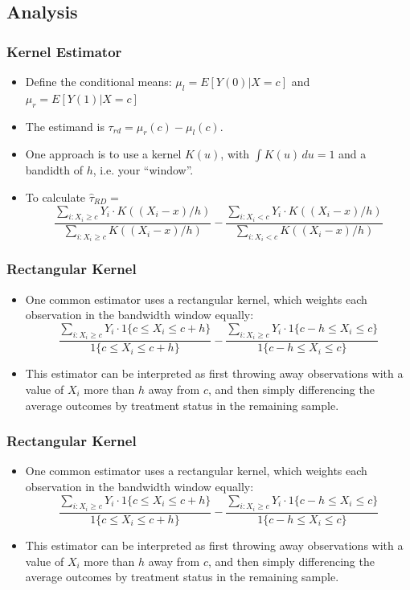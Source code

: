 \documentclass{beamer}
\begin{document}
\subsection{Analysis}
\begin{frame}
  \frametitle{Kernel Estimator}
  \begin{itemize}
  \item Define the conditional means: $\mu_l=E[Y(0)|X=c]$ and $\mu_r=E[Y(1)|X=c]$
  \item The estimand is $\tau_{rd}=\mu_r(c) - \mu_l(c)$.
  \item One approach is to use a kernel $K(u)$, with $\int \! K(u) \,
    du = 1$ and a bandidth of $h$, i.e. your ``window''. 
    \item To calculate $\hat \tau_{RD} = $
$$
\frac{\sum_{i:X_i \geq c} Y_i \cdot K((X_i
  -x)/h)}{\sum_{i:X_i\geq c} K((X_i - x)/h)} - \frac{\sum_{i:X_i < c} Y_i \cdot K((X_i
   -x)/h)}{\sum_{i:X_i< c} K((X_i - x)/h)}
$$
 \end{itemize}
\end{frame}

\begin{frame}
  \frametitle{Rectangular Kernel}
  \begin{itemize}
  \item One common estimator uses a rectangular kernel, which weights each observation in the bandwidth window  equally:
\small
$$
\frac{\sum_{i:X_i \geq c} Y_i \cdot 1\{c\leq X_i \leq c + h\}}{1\{c\leq X_i \leq c + h\}} - \frac{\sum_{i:X_i \geq c} Y_i \cdot 1\{c-h\leq X_i \leq c \}}{1\{c-h\leq X_i \leq c\}}
$$
\normalsize
\item  This estimator can be interpreted as first throwing away observations with a value of $X_i$ more than $h$ away from $c$, and then simply differencing the average outcomes by treatment status in the remaining sample. 
\end{itemize}
\end{frame}

\begin{frame}
  \frametitle{Rectangular Kernel}
  \begin{itemize}
  \item One common estimator uses a rectangular kernel, which weights each observation in the bandwidth window  equally:
\small
$$
\frac{\sum_{i:X_i \geq c} Y_i \cdot 1\{c\leq X_i \leq c + h\}}{1\{c\leq X_i \leq c + h\}} - \frac{\sum_{i:X_i \geq c} Y_i \cdot 1\{c-h\leq X_i \leq c \}}{1\{c-h\leq X_i \leq c\}}
$$
\normalsize
\item  This estimator can be interpreted as first throwing away observations with a value of $X_i$ more than $h$ away from $c$, and then simply differencing the average outcomes by treatment status in the remaining sample. 
\end{itemize}
\end{frame}
\end{document}
